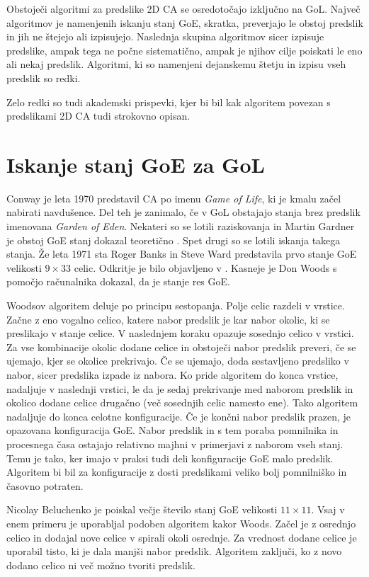 \documentclass[12pt,a4paper,openany,twoside]{book}
\begin{document}
Obstoječi algoritmi za predslike 2D CA se osredotočajo izključno na GoL.
Največ algoritmov je namenjenih iskanju stanj GoE, skratka,
preverjajo le obstoj predslik in jih ne štejejo ali izpisujejo.
Naslednja skupina algoritmov sicer izpisuje predslike,
ampak tega ne počne sistematično,
ampak je njihov cilje poiskati le eno ali nekaj predslik.
Algoritmi, ki so namenjeni dejanskemu štetju in izpisu vseh predslik so redki.

Zelo redki so tudi akademski prispevki,
kjer bi bil kak algoritem povezan s predslikami 2D CA tudi strokovno opisan.

\section{Iskanje stanj GoE za GoL}

Conway je leta 1970 predstavil CA po imenu \emph{Game of Life},
ki je kmalu začel nabirati navdušence.
Del teh je zanimalo, če v GoL obstajajo stanja brez predslik imenovana \emph{Garden of Eden}.
Nekateri so se lotili raziskovanja in Martin Gardner je obstoj GoE stanj dokazal teoretično \cite{WikiGoE}.
Spet drugi so se lotili iskanja takega stanja.
Že leta 1971 sta Roger Banks in Steve Ward
predstavila prvo stanje GoE velikosti \(9 \times 33\) celic.
Odkritje je bilo objavljeno v \cite{Lifeline3}. Kasneje je Don Woods
\cite{Lifeline3, Lifeline4} s pomočjo računalnika dokazal, da je stanje res GoE.

Woodsov algoritem deluje po principu sestopanja. Polje celic razdeli v vrstice.
Začne z eno vogalno celico, katere nabor predslik je kar nabor okolic,
ki se preslikajo v stanje celice. V naslednjem koraku opazuje sosednjo celico v vrstici.
Za vse kombinacije okolic dodane celice in obstoječi nabor predslik preveri,
če se ujemajo, kjer se okolice prekrivajo. Če se ujemajo, doda sestavljeno predsliko v nabor,
sicer predslika izpade iz nabora. Ko pride algoritem do konca vrstice, nadaljuje v naslednji vrstici,
le da je sedaj prekrivanje med naborom predslik in okolico dodane celice drugačno (več sosednjih celic namesto ene).
Tako algoritem nadaljuje do konca celotne konfiguracije.
Če je končni nabor predslik prazen, je opazovana konfiguracija GoE.
Nabor predslik in s tem poraba pomnilnika in procesnega časa ostajajo
relativno majhni v primerjavi z naborom vseh stanj.
Temu je tako, ker imajo v praksi tudi deli konfiguracije GoE malo predslik.
Algoritem bi bil za konfiguracije z dosti predslikami veliko bolj pomnilniško in časovno potraten.

Nicolay Beluchenko je poiskal večje število stanj GoE velikosti \(11 \times 11\).
Vsaj v enem primeru je uporabljal podoben algoritem kakor Woods.
Začel je z osrednjo celico in dodajal nove celice v spirali okoli osrednje.
Za vrednost dodane celice je uporabil tisto, ki je dala manjši nabor predslik.
Algoritem zaključi, ko z novo dodano celico ni več možno tvoriti predslik.
\end{document}
